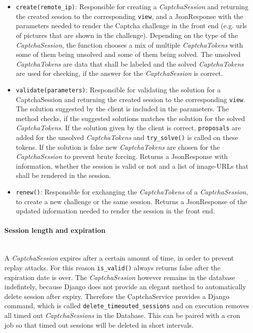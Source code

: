 \begin{itemize}
\item \verb|create(remote_ip)|: Responsible for creating a \emph{CaptchaSession} and returning the created session to the corresponding \verb|view|, and a JsonResponse with the parameters needed to render the Captcha challenge in the front end (e.g. urls of pictures that are shown in the challenge). Depending on the type of the \emph{CaptchaSession}, the function chooses a mix of multiple \emph{CaptchaTokens} with some of them being unsolved and some of them being solved. The unsolved \emph{CaptchaTokens} are data that shall be labeled and the solved \emph{CaptchaTokens} are used for checking, if the answer for the \emph{CaptchaSession} is correct. 
\item \verb|validate(parameters)|: Responsible for validating the solution for a CaptchaSession and returning the created session to the corresponding \verb|view|. The solution suggested by the client is included in the parameters. The method checks, if the suggested solutions matches the solution for the solved \emph{CaptchaTokens}. If the solution given by the client is correct, \verb|proposals| are added for the unsolved \emph{CaptchaTokens} and \verb|try_solve()| is called on these tokens. If the solution is false new \emph{CaptchaTokens} are chosen for the \emph{CaptchaSession} to prevent brute forcing. Returns a JsonResponse with information, whether the session is valid or not and a list of image-URLs that shall be rendered in the session.
\item \verb|renew()|: Responsible for exchanging the \emph{CaptchaTokens} of a \emph{CaptchaSession}, to create a new challenge or the same session. Returns a JsonResponse of the updated information needed to render the session in the front end.
\end{itemize}

\clearpage
\paragraph{Session length and expiration} \mbox{} \\

A \emph{CaptchaSession} expires after a certain amount of time, in order to prevent replay attacks. For this reason \verb|is_valid()| always returns false after the expiration date is over. The \emph{CaptchaSession} however remains in the database indefintely, because Django does not provide an elegant method to automatically delete session after expiry. Therefore the CaptchaService provides a Django command, which is called \verb|delete_timeouted_sessions| and on execution removes all timed out \emph{CaptchaSessions} in the Database. This can be paired with a cron job so that timed out sessions will be deleted in short intervals. 

